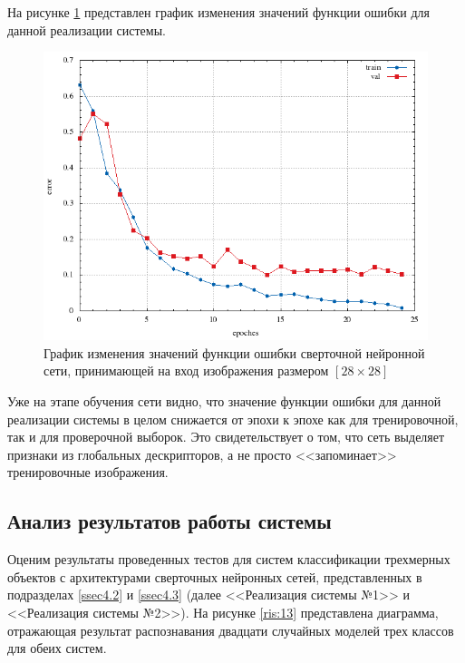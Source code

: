 \documentclass[14pt]{article}
\numberwithin{figure}{section}
\numberwithin{equation}{section}
\begin{document}
На рисунке \ref{ris:12} представлен график изменения значений функции ошибки для данной реализации системы.
\begin{figure}[h]
   \begin{center}
       \includegraphics[scale=0.95] {12.JPG}
       \caption{График изменения значений функции ошибки сверточной нейронной сети, принимающей на вход изображения размером $[28 \times 28]$}
       \label{ris:12}
   \end{center}
\end{figure}
Уже на этапе обучения сети видно, что значение функции ошибки для данной реализации системы в целом снижается от эпохи к эпохе как для тренировочной, так и для проверочной выборок. Это свидетельствует о том, что сеть выделяет признаки из глобальных дескрипторов, а не просто <<запоминает>> тренировочные изображения.

\subsection{Анализ результатов работы системы}\label{ssec4.4}

Оценим результаты проведенных тестов для систем классификации трехмерных объектов с архитектурами сверточных нейронных сетей, представленных в подразделах \ref{ssec4.2} и \ref{ssec4.3} (далее <<Реализация системы №1>> и <<Реализация системы №2>>). На рисунке \ref{ris:13} представлена диаграмма, отражающая результат распознавания двадцати случайных моделей трех классов для обеих систем.
\end{document}
